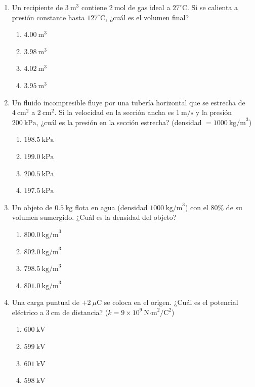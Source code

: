 \documentclass[12pt]{article}
\begin{document}
\begin{enumerate}
\item Un recipiente de $3\ \text{m}^3$ contiene $2\ \text{mol}$ de gas ideal a $27^\circ\text{C}$. Si se calienta a presión constante hasta $127^\circ\text{C}$, ¿cuál es el volumen final?
\begin{enumerate}[label=(\alph*)]
\item $4.00\ \text{m}^3$
\item $3.98\ \text{m}^3$
\item $4.02\ \text{m}^3$
\item $3.95\ \text{m}^3$
\end{enumerate}

\item Un fluido incompresible fluye por una tubería horizontal que se estrecha de $4\ \text{cm}^2$ a $2\ \text{cm}^2$. Si la velocidad en la sección ancha es $1\ \text{m/s}$ y la presión $200\ \text{kPa}$, ¿cuál es la presión en la sección estrecha? (densidad $= 1000\ \text{kg/m}^3$)
\begin{enumerate}[label=(\alph*)]
\item $198.5\ \text{kPa}$
\item $199.0\ \text{kPa}$
\item $200.5\ \text{kPa}$
\item $197.5\ \text{kPa}$
\end{enumerate}

\item Un objeto de $0.5\ \text{kg}$ flota en agua (densidad $1000\ \text{kg/m}^3$) con el $80\%$ de su volumen sumergido. ¿Cuál es la densidad del objeto?
\begin{enumerate}[label=(\alph*)]
\item $800.0\ \text{kg/m}^3$
\item $802.0\ \text{kg/m}^3$
\item $798.5\ \text{kg/m}^3$
\item $801.0\ \text{kg/m}^3$
\end{enumerate}

\item Una carga puntual de $+2\ \mu\text{C}$ se coloca en el origen. ¿Cuál es el potencial eléctrico a $3\ \text{cm}$ de distancia? ($k = 9\times10^9\ \text{N·m}^2/\text{C}^2$)
\begin{enumerate}[label=(\alph*)]
\item $600\ \text{kV}$
\item $599\ \text{kV}$
\item $601\ \text{kV}$
\item $598\ \text{kV}$
\end{enumerate}


\end{enumerate}
\end{document}
